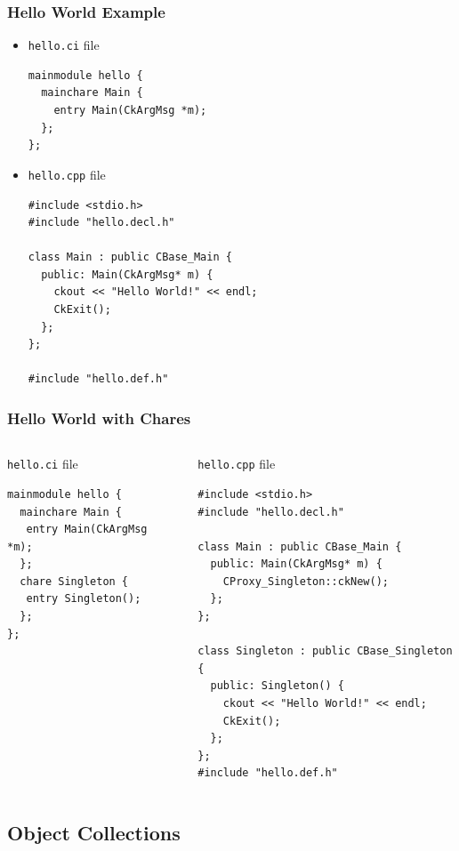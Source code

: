\begin{frame}[fragile]
   \frametitle{Hello World Example}\scriptsize
\begin{itemize}
\item \texttt{hello.ci} file
   \begin{lstlisting}
mainmodule hello {
  mainchare Main {
    entry Main(CkArgMsg *m);
  };
};
   \end{lstlisting}
\item \texttt{hello.cpp} file
\lstset{basicstyle=\footnotesize}
   \begin{lstlisting}
#include <stdio.h>
#include "hello.decl.h"

class Main : public CBase_Main {
  public: Main(CkArgMsg* m) {
    ckout << "Hello World!" << endl;
    CkExit();
  };
};

#include "hello.def.h"
   \end{lstlisting}
\end{itemize}
\end{frame}

\begin{frame}[fragile]
   \frametitle{Hello World with Chares}\scriptsize
\begin{columns}
\begin{column}{.45\linewidth}
\texttt{hello.ci} file
   \begin{lstlisting}
mainmodule hello {
  mainchare Main { 
   entry Main(CkArgMsg *m); 
  };
  chare Singleton {
   entry Singleton();
  };
};
   \end{lstlisting}
\end{column}
\begin{column}{.55\linewidth}
\texttt{hello.cpp} file
\begin{lstlisting}
#include <stdio.h>
#include "hello.decl.h"

class Main : public CBase_Main {
  public: Main(CkArgMsg* m) {
    CProxy_Singleton::ckNew();
  };
};

class Singleton : public CBase_Singleton {
  public: Singleton() {
    ckout << "Hello World!" << endl;
    CkExit();
  };
};
#include "hello.def.h"
\end{lstlisting}
\end{column}
\end{columns}
\end{frame}


\subsection[Collections]{Object Collections}


